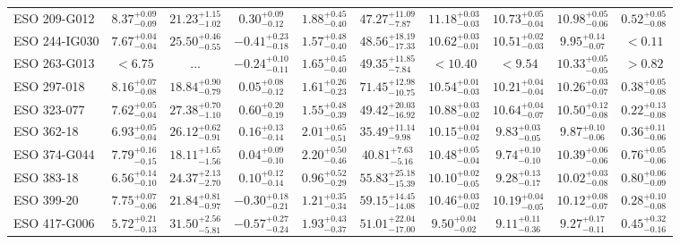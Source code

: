 \documentclass[onecolumn]{mn2e}
\begin{document}
\begin{landscape}
{\begin{center}
\begin{longtable}{lccccccccc}
ESO 209-G012 & $8.37_{-0.09}^{+0.09}$ & $21.23_{-1.02}^{+1.15}$ & $0.30_{-0.12}^{+0.09}$ & $1.88_{-0.40}^{+0.45}$ &$47.27_{-7.87}^{+11.09}$ & $11.18_{-0.03}^{+0.03}$ & $10.73_{-0.04}^{+0.05}$ & $10.98_{-0.06}^{+0.05}$ & $0.52_{-0.08}^{+0.05}$ \\
ESO 244-IG030 & $7.67_{-0.04}^{+0.04}$ & $25.50_{-0.55}^{+0.46}$ & $-0.41_{-0.18}^{+0.23}$ & $1.57_{-0.40}^{+0.48}$ &$48.56_{-17.33}^{+18.19}$ & $10.62_{-0.01}^{+0.03}$ & $10.51_{-0.03}^{+0.02}$ & $9.95_{-0.07}^{+0.14}$ & $<0.11$ \\
ESO 263-G013 & $<6.75$ & ... & $-0.24_{-0.11}^{+0.10}$ & $1.65_{-0.40}^{+0.45}$ &$49.35_{-7.84}^{+11.85}$ & $<10.40$ & $<9.54$ & $10.33_{-0.05}^{+0.05}$ & $>0.82$ \\
ESO 297-018 & $8.16_{-0.08}^{+0.07}$ & $18.84_{-0.79}^{+0.90}$ & $0.05_{-0.12}^{+0.08}$ & $1.61_{-0.23}^{+0.26}$ &$71.45_{-10.75}^{+12.98}$ & $10.54_{-0.03}^{+0.01}$ & $10.21_{-0.04}^{+0.04}$ & $10.26_{-0.07}^{+0.03}$ & $0.38_{-0.08}^{+0.05}$ \\
ESO 323-077 & $7.62_{-0.04}^{+0.05}$ & $27.38_{-1.10}^{+0.70}$ & $0.60_{-0.19}^{+0.20}$ & $1.55_{-0.39}^{+0.48}$ &$49.42_{-16.92}^{+20.03}$ & $10.88_{-0.02}^{+0.03}$ & $10.64_{-0.07}^{+0.04}$ & $10.50_{-0.08}^{+0.12}$ & $0.22_{-0.08}^{+0.13}$ \\
ESO 362-18 & $6.93_{-0.04}^{+0.05}$ & $26.12_{-0.91}^{+0.62}$ & $0.16_{-0.14}^{+0.13}$ & $2.01_{-0.51}^{+0.65}$ &$35.49_{-9.98}^{+11.14}$ & $10.15_{-0.02}^{+0.04}$ & $9.83_{-0.05}^{+0.03}$ & $9.87_{-0.06}^{+0.10}$ & $0.36_{-0.06}^{+0.11}$ \\
ESO 374-G044 & $7.79_{-0.15}^{+0.16}$ & $18.11_{-1.56}^{+1.65}$ & $0.04_{-0.10}^{+0.09}$ & $2.20_{-0.46}^{+0.50}$ &$40.81_{-5.16}^{+7.63}$ & $10.48_{-0.04}^{+0.05}$ & $9.74_{-0.10}^{+0.10}$ & $10.39_{-0.06}^{+0.06}$ & $0.76_{-0.06}^{+0.05}$ \\
ESO 383-18 & $6.56_{-0.10}^{+0.14}$ & $24.37_{-2.70}^{+2.13}$ & $0.10_{-0.14}^{+0.12}$ & $0.96_{-0.29}^{+0.52}$ &$55.83_{-15.39}^{+25.18}$ & $10.10_{-0.05}^{+0.02}$ & $9.28_{-0.17}^{+0.13}$ & $10.02_{-0.08}^{+0.03}$ & $0.80_{-0.09}^{+0.06}$ \\
ESO 399-20 & $7.75_{-0.06}^{+0.07}$ & $21.84_{-0.97}^{+0.81}$ & $-0.30_{-0.21}^{+0.18}$ & $1.21_{-0.34}^{+0.35}$ &$59.15_{-14.08}^{+14.45}$ & $10.46_{-0.02}^{+0.03}$ & $10.19_{-0.05}^{+0.04}$ & $10.12_{-0.07}^{+0.08}$ & $0.28_{-0.08}^{+0.10}$ \\
ESO 417-G006 & $5.72_{-0.13}^{+0.21}$ & $31.50_{-5.81}^{+2.56}$ & $-0.57_{-0.24}^{+0.27}$ & $1.93_{-0.37}^{+0.43}$ &$51.01_{-17.00}^{+22.04}$ & $9.50_{-0.02}^{+0.04}$ & $9.11_{-0.36}^{+0.11}$ & $9.27_{-0.11}^{+0.17}$ & $0.45_{-0.16}^{+0.32}$ \\

\end{longtable}
\end{center}}
\end{landscape}
\end{document}
